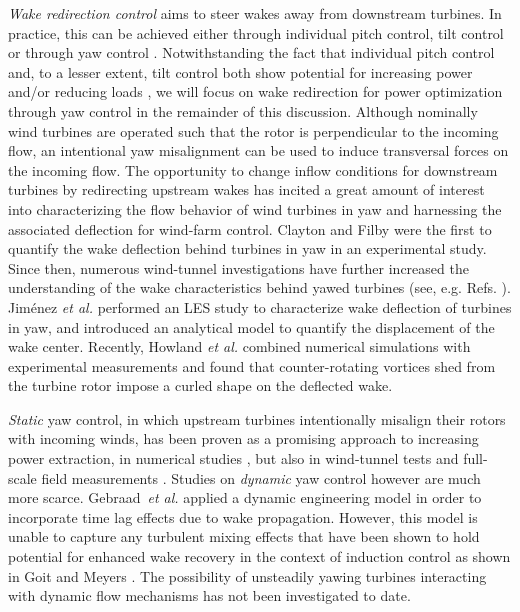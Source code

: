 \documentclass[energies,article,submit,moreauthors,latex,10pt,a4paper]{mdpi}
\begin{document}
\emph{Wake redirection control} aims to steer wakes away from downstream turbines. In practice, this can be achieved either through individual pitch control, tilt control or through yaw control \cite{fleming2014evaluating}. Notwithstanding the fact that individual pitch control and, to a lesser extent, tilt control both show potential for increasing power and/or reducing loads  \cite{bossanyi2003individual,fleming2015simulation,verhulst2015altering}, we will focus on wake redirection for power optimization through yaw control in the remainder of this discussion. Although nominally wind turbines are operated such that the rotor is perpendicular to the incoming flow, an intentional yaw misalignment can be used to induce transversal forces on the incoming flow. The opportunity to change inflow conditions for downstream turbines by redirecting upstream wakes has incited a great amount of interest into characterizing the flow behavior of wind turbines in yaw and harnessing the associated deflection for wind-farm control. Clayton and Filby \cite{clayton1982measured} were the first to quantify the wake deflection behind turbines in yaw in an experimental study. Since then, numerous wind-tunnel investigations have further increased the understanding of the wake characteristics behind yawed turbines (see, e.g. Refs. \cite{grant1997optical, medici2008measurements, bastankhah2016experimental}). Jim\'enez \emph{et al.} \cite{jimenez2010application} performed an LES study to characterize wake deflection of turbines in yaw, and introduced an analytical model to quantify the displacement of the wake center. Recently, Howland \emph{et al.} \cite{howland2016wake} combined numerical simulations with experimental measurements and found that counter-rotating vortices shed from the turbine rotor impose a curled shape on the deflected wake. 

\emph{Static} yaw control, in which upstream turbines intentionally misalign their rotors with incoming winds, has been proven as a promising approach to increasing power extraction, in numerical studies \cite{gebraad2016wind, quick2017optimization}, but also in wind-tunnel tests \cite{campagnolo2016wind2,park2017data} and full-scale field measurements \cite{soleimanzadeh2014state, fleming2017field}. Studies on \emph{dynamic} yaw control however are much more scarce. Gebraad~\emph{et al.} \cite{gebraad2015wind} applied a dynamic engineering model in order to incorporate time lag effects due to wake propagation. However, this model is unable to capture any turbulent mixing effects that have been shown to hold potential for enhanced wake recovery in the context of induction control as shown in Goit and Meyers \cite{goit2015optimal}. The possibility of unsteadily yawing turbines interacting with dynamic flow mechanisms has not been investigated to date. 
\end{document}
